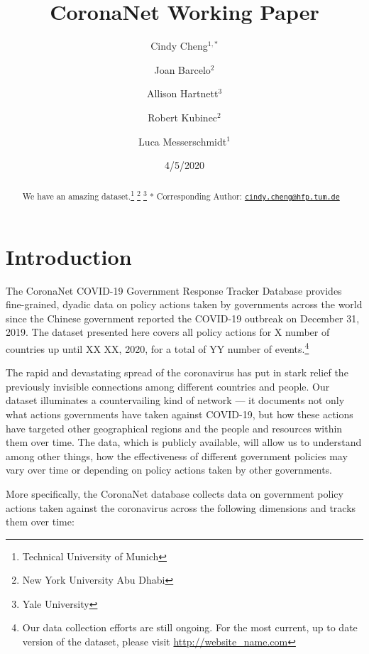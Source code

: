 \documentclass[
]{article}
\title{CoronaNet Working Paper}
\author{Cindy Cheng\(^{1,*}\) \and Joan Barcelo\(^2\) \and Allison Hartnett\(^3\) \and Robert Kubinec\(^2\) \and Luca Messerschmidt\(^1\)}
\date{4/5/2020}
\begin{document}
\maketitle
\begin{abstract}
We have an amazing dataset.\footnote{Technical University of Munich} \footnote{New York University Abu Dhabi} \footnote{Yale University} * Corresponding Author: \href{mailto:cindy.cheng@hfp.tum.de}{\nolinkurl{cindy.cheng@hfp.tum.de}}
\end{abstract}

\hypertarget{introduction}{%
\section{Introduction}\label{introduction}}

The CoronaNet COVID-19 Government Response Tracker Database provides fine-grained, dyadic data on policy actions taken by governments across the world since the Chinese government reported the COVID-19 outbreak on December 31, 2019. The dataset presented here covers all policy actions for X number of countries up until XX XX, 2020, for a total of YY number of events.\footnote{Our data collection efforts are still ongoing. For the most current, up to date version of the dataset, please visit \url{http://website_name.com}}

The rapid and devastating spread of the coronavirus has put in stark relief the previously invisible connections among different countries and people. Our dataset illuminates a countervailing kind of network --- it documents not only what actions governments have taken against COVID-19, but how these actions have targeted other geographical regions and the people and resources within them over time. The data, which is publicly available, will allow us to understand among other things, how the effectiveness of different government policies may vary over time or depending on policy actions taken by other governments.

More specifically, the CoronaNet database collects data on government policy actions taken against the coronavirus across the following dimensions and tracks them over time:
\end{document}
